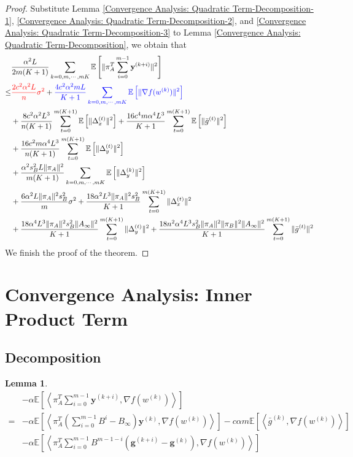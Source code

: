 \documentclass{article}
\newtheorem{lemma}[thm]{Lemma}
\newcommand{\vg}{{\mathbf{g}}}
\newcommand{\vy}{{\mathbf{y}}}
\newcommand{\EE}[1]{\mathbb{E}\left[#1\right]}
\newcommand{\norm}[1]{\| #1 \|}
\newcommand{\ip}[1]{\left\langle#1\right\rangle}
\begin{document}
\begin{proof}
  Substitute Lemma \ref{Convergence Analysis: Quadratic Term-Decomposition-1}, \ref{Convergence Analysis: Quadratic Term-Decomposition-2}, and \ref{Convergence Analysis: Quadratic Term-Decomposition-3} to Lemma \ref{Convergence Analysis: Quadratic Term-Decomposition}, we obtain that 
  \begin{align*}
    &\frac{\alpha^2L}{2m(K+1)}\sum_{k=0,m,\cdots,mK}\EE{\norm{\pi_A^T\sum_{i=0}^{m-1}\vy^{(k+i)}}^2}\\
    \leq&\textcolor{red}{ \frac{2c^2\alpha^2L}{n}\sigma^2}+ \textcolor{blue}{\frac{4c^2\alpha^2mL}{K+1}\sum_{k=0,m,\cdots,mK}\EE{\norm{\nabla f(w^{(k)})}^2}}\\&+\frac{8c^2\alpha^2L^3}{n(K+1)}\sum_{t=0}^{m(K+1)}\EE{\norm{\Delta_x^{(t)}}^2}+\frac{16c^4m\alpha^4L^3}{K+1}\sum_{t=0}^{m(K+1)}\EE{\norm{\bar{g}^{(t)}}^2}\\&+\frac{16c^2m\alpha^4L^3}{n(K+1)}\sum_{t=0}^{m(K+1)}\EE{\norm{\Delta_y^{(t)}}^2}
    \\&+\frac{\alpha^2s_B^2L\norm{\pi_A}^2}{m(K+1)}\sum_{k=0,m,\cdots,mK}\EE{\norm{\Delta_y^{(k)}}^2}
    \\&+\frac{6\alpha^2L\norm{\pi_A}^2s_B^2}{m}\sigma^2+\frac{18\alpha^2L^3\norm{\pi_A}^2s_B^2}{ K+1}\sum_{t=0}^{m(K+1)}\norm{\Delta_x^{(t)}}^2\\&+\frac{18\alpha^4L^3\norm{\pi_A}^2s_B^2\norm{A_{\infty}}^2}{ K+1}\sum_{t=0}^{m(K+1)}\norm{\Delta_y^{(t)}}^2+\frac{18n^2\alpha^4L^3s_B^2\norm{\pi_A}^2\norm{\pi_B}^2\norm{A_{\infty}}^2}{ K+1}\sum_{t=0}^{m(K+1)}\norm{\bar{g}^{(t)}}^2
  \end{align*}
  We finish the proof of the theorem.
\end{proof}

\section{Convergence Analysis: Inner Product Term}
\subsection{Decomposition}

\begin{lemma}\label{Convergence Analysis: Inner Product Term-Decomposition}
  \begin{align*}
    &-\alpha\EE{\ip{\pi_A^T\sum_{i=0}^{m-1}\vy^{(k+i)},\nabla f(w^{(k)})}}\\
    =&-\alpha\EE{\ip{\pi_A^T(\sum_{i=0}^{m-1}B^i-B_{\infty}) \vy^{(k)},\nabla f(w^{(k)})}}-c\alpha m\EE{\ip{\bar{g}^{(k)},\nabla f(w^{(k)})}}\\&-\alpha\EE{\ip{\pi_A^T\sum_{i=0}^{m-1}B^{m-1-i}(\vg^{(k+i)}-\vg^{(k)}),\nabla f(w^{(k)})}}
  \end{align*}
\end{lemma}
\end{document}
